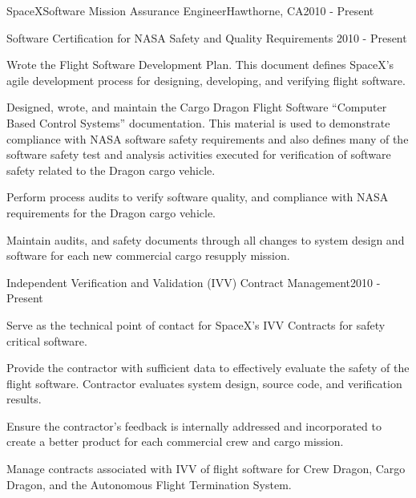 



\begin{cventries}


  \cventry
  {SpaceX}{Software Mission Assurance Engineer}{Hawthorne, CA}{2010 - Present}
  {}

  \cventry
  {Software Certification for NASA Safety and Quality Requirements}
  {}{}{2010 - Present}
  {
    \begin{cvitems}
    \item Wrote the Flight Software Development Plan. This document defines
      SpaceX's agile development process for designing, developing, and
      verifying flight software.
    \item Designed, wrote, and maintain the Cargo Dragon Flight Software
      ``Computer Based Control Systems'' documentation. This material is
      used to demonstrate compliance with NASA software safety
      requirements and also defines many of the software safety test and
      analysis activities executed for verification of software safety
      related to the Dragon cargo vehicle.
    \item Perform process audits to verify software quality, and
      compliance with NASA requirements for the Dragon cargo vehicle.
    \item Maintain audits, and safety documents through all changes to
      system design and software for each new commercial cargo resupply
      mission.
    \end{cvitems}
  }


  \cventry
  {Independent Verification and Validation (IVV) Contract Management}{}{}{2010 - Present}
  {
    \begin{cvitems}
    \item Serve as the technical point of contact for SpaceX's IVV Contracts for
      safety critical software.
    \item Provide the contractor with sufficient data to effectively
      evaluate the safety of the flight software. Contractor evaluates
      system design, source code, and verification results.
    \item Ensure the contractor's feedback is internally addressed and
      incorporated to create a better product for each commercial crew and
      cargo mission.
    \item Manage contracts associated with IVV of flight software for Crew
      Dragon, Cargo Dragon, and the Autonomous Flight Termination
      System.
    \end{cvitems}
  }


\end{cventries}
